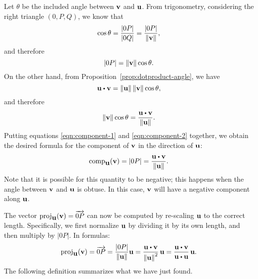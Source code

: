 Let $\theta$ be the included angle between $\mbox{\bf v}$ and
$\mbox{\bf u}$. From trigonometry, considering the right triangle
$(0,P,Q)$, we know that
\begin{equation*}
  \cos \theta = \frac{|0P|}{|0Q|} = \frac{|0P|}{\left\|\mbox{\bf v}\right\|},
\end{equation*}
and therefore
\begin{equation}\label{eqn:component-1}
  |0P| = \left\|\mbox{\bf v}\right\| \cos \theta.
\end{equation}
On the other hand, from Proposition~\ref{prop:dotproduct-angle},  we
have
\begin{equation*}
  \vect{u}\dotprod \vect{v}=\norm{\vect{u}} \norm{\vect{v}} \cos \theta,
\end{equation*}
and therefore
\begin{equation}\label{eqn:component-2}
  \norm{\vect{v}} \cos \theta = \frac{\vect{u}\dotprod \vect{v}}{\norm{\vect{u}}}.
\end{equation}
Putting equations {\eqref{eqn:component-1}} and
{\eqref{eqn:component-2}} together, we obtain the desired formula for
the component of $\mbox{\bf v}$ in the direction of $\mbox{\bf u}$:
\begin{equation}\label{eqn:component}
  \comp_{\vect{u}}(\vect{v})
  = |0P|
  = \frac{\vect{u}\dotprod \vect{v}}{\norm{\vect{u}}}.
\end{equation}
Note that it is possible for this quantity to be negative; this
happens when the angle between $\mbox{\bf v}$ and $\mbox{\bf u}$ is obtuse.
In this case, $\mbox{\bf v}$ will have a negative component along
$\mbox{\bf u}$.

The vector $\proj_{\vect{u}}(\vect{v})=\longvect{0P}$ can now be
computed by re-scaling $\mbox{\bf u}$ to the correct length. Specifically,
we first normalize $\mbox{\bf u}$ by dividing it by its own length, and
then multiply by $|0P|$. In formulas:
\begin{equation}
  \proj_{\vect{u}}(\vect{v})
  = \longvect{0P}
  = \frac{|0P|}{\norm{\vect{u}}}\vect{u}
  = \frac{\vect{u}\dotprod \vect{v}}{\norm{\vect{u}}^2}\,\vect{u}
  = \frac{\vect{u}\dotprod \vect{v}}{\vect{u}\dotprod \vect{u}}\,\vect{u}.
\end{equation}
The following definition summarizes what we have just found.

